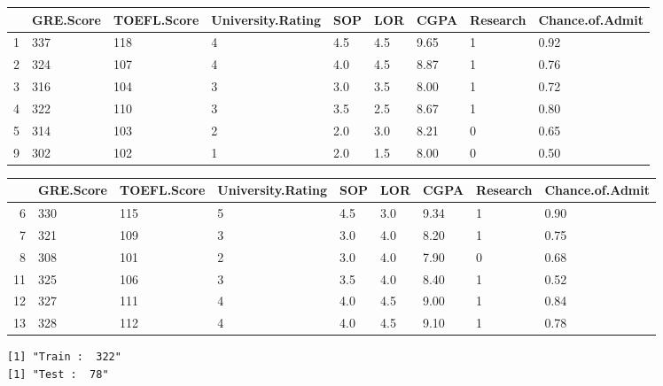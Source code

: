 \documentclass[11pt]{article}
\begin{document}
    \begin{tabular}{r|llllllll}
  & GRE.Score & TOEFL.Score & University.Rating & SOP & LOR & CGPA & Research & Chance.of.Admit\\
\hline
	1 & 337  & 118  & 4    & 4.5  & 4.5  & 9.65 & 1    & 0.92\\
	2 & 324  & 107  & 4    & 4.0  & 4.5  & 8.87 & 1    & 0.76\\
	3 & 316  & 104  & 3    & 3.0  & 3.5  & 8.00 & 1    & 0.72\\
	4 & 322  & 110  & 3    & 3.5  & 2.5  & 8.67 & 1    & 0.80\\
	5 & 314  & 103  & 2    & 2.0  & 3.0  & 8.21 & 0    & 0.65\\
	9 & 302  & 102  & 1    & 2.0  & 1.5  & 8.00 & 0    & 0.50\\
\end{tabular}


    
    \begin{tabular}{r|llllllll}
  & GRE.Score & TOEFL.Score & University.Rating & SOP & LOR & CGPA & Research & Chance.of.Admit\\
\hline
	6 & 330  & 115  & 5    & 4.5  & 3.0  & 9.34 & 1    & 0.90\\
	7 & 321  & 109  & 3    & 3.0  & 4.0  & 8.20 & 1    & 0.75\\
	8 & 308  & 101  & 2    & 3.0  & 4.0  & 7.90 & 0    & 0.68\\
	11 & 325  & 106  & 3    & 3.5  & 4.0  & 8.40 & 1    & 0.52\\
	12 & 327  & 111  & 4    & 4.0  & 4.5  & 9.00 & 1    & 0.84\\
	13 & 328  & 112  & 4    & 4.0  & 4.5  & 9.10 & 1    & 0.78\\
\end{tabular}


    
    \begin{Verbatim}[commandchars=\\\{\}]
[1] "Train :  322"
[1] "Test :  78"
    \end{Verbatim}
\end{document}
